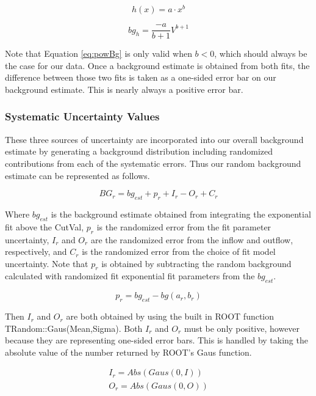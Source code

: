 \begin{equation} \label{eq:powfit}
h(x) = a \cdot x^b
\end{equation}

\begin{equation} \label{eq:powBg}
bg_h = \frac{-a}{b+1} V^{b+1}
\end{equation}

Note that Equation \ref{eq:powBg} is only valid when $b < 0$, which should always be the case for our data. 
Once a background estimate is obtained from both fits, the difference between those two fits is taken as a one-sided error bar on our background estimate.  This is nearly always a positive error bar. 
 
\subsubsection{Systematic Uncertainty Values}

These three sources of uncertainty are incorporated into our overall background estimate by generating a background distribution including randomized contributions from each of the systematic errors.  Thus our random background estimate can be represented as follows.

\begin{equation} \label{eq:bgRFull}
BG_{r} = bg_{est} + p_{r} + I_{r} - O_{r} + C_{r}
\end{equation}

Where $bg_{est}$ is the background estimate obtained from integrating the exponential fit above the CutVal, $p_{r}$ is the randomized error from the fit parameter uncertainty, $I_{r}$ and $O_{r}$ are the randomized error from the inflow and outflow, respectively, and $C_{r}$ is the randomized error from the choice of fit model uncertainty.   Note that $p_{r}$ is obtained by subtracting the random background calculated with randomized fit exponential fit parameters from the $bg_{est}$.

\begin{equation}
p_{r} = bg_{est} - bg(a_{r},b_{r})
\end{equation}

Then $I_{r}$ and $O_{r}$ are both obtained by using the built in ROOT function TRandom::Gaus(Mean,Sigma).  Both $I_{r}$ and $O_{r}$ must be only positive, however because they are representing one-sided error bars.  This is handled by taking the absolute value of the number returned by ROOT's Gaus function.

\begin{equation}
\begin{split}
I_{r}  = Abs( Gaus(0,I) ) \\
O_{r} = Abs( Gaus(0,O) )
\end{split}
 \end{equation}

